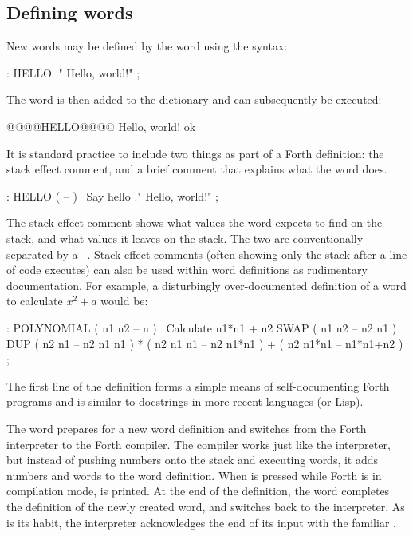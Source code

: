 \subsection{Defining words}

New words may be defined by the \fw{:} word using the  syntax:

\begin{forthcode}
: HELLO ." Hello, world!" ;
\end{forthcode}

\noindent The word  is then added to the dictionary and can subsequently be
executed:

\begin{intrcode}
@@@@HELLO@@@@ Hello, world! ok
\end{intrcode}

\noindent It is standard practice to include two things as part of a Forth definition:
the \gls{stack effect comment}, and a brief comment that explains what the word does. 

\begin{forthcode}
: HELLO ( -- ) \ Say hello
  ." Hello, world!" ;
\end{forthcode}

\noindent The stack effect comment shows what values the word expects to find
on the stack, and what values it leaves on the stack. The two are
conventionally separated by a \texttt{--}. Stack effect comments (often showing
only the stack after a line of code executes) can also be used within word
definitions as rudimentary documentation. For example, a disturbingly
over-documented definition of a  word to calculate $x^2 + a$
would be:

\begin{forthcode}
: POLYNOMIAL ( n1 n2 -- n ) \ Calculate n1*n1 + n2
  SWAP ( n1 n2 -- n2 n1 )
  DUP  ( n2 n1 -- n2 n1 n1 )
  *    ( n2 n1 n1 -- n2 n1*n1 )
  +    ( n2 n1*n1 -- n1*n1+n2 )
;
\end{forthcode}

\noindent The first line of the definition forms a simple means of self-documenting Forth
programs and is similar to docstrings in more recent languages (or Lisp).

The \fw{:} word prepares for a new word definition and switches from the Forth
interpreter to the Forth compiler. The compiler works just like the
interpreter, but instead of pushing numbers onto the stack and executing words,
it adds numbers and words to the word definition. When  is
pressed while Forth is in compilation mode,  is printed. At
the end of the definition, the \fw{;} word completes the definition of the
newly created word, and switches back to the interpreter. As is its habit, the
interpreter acknowledges the end of its input with the familiar .

